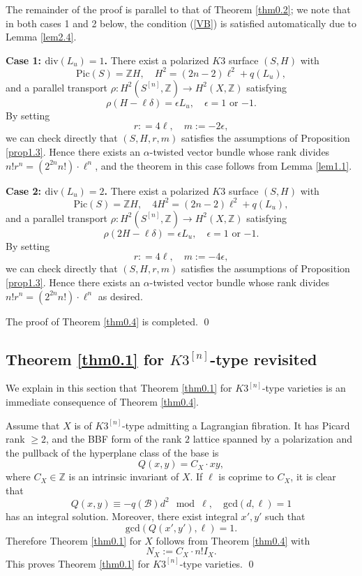 \documentclass[11pt]{amsart}
\theoremstyle{plain}
\theoremstyle{definition}
\theoremstyle{remark}
\newcommand{\BZ}{{\mathbb{Z}}}
\newcommand{\CB}{{\mathcal B}}
\begin{document}
The remainder of the proof is parallel to that of Theorem \ref{thm0.2}; we note that in both cases 1 and 2 below, the condition (\ref{VB}) is satisfied automatically due to Lemma \ref{lem2.4}.
\medskip



{\bf \noindent Case 1: $\mathrm{div}(L_u)=1$.} There exist a polarized $K3$ surface $(S,H)$ with
\[
\mathrm{Pic}(S) = \BZ H, \quad H^2= (2n-2)\ell^2+ q(L_u),
\]
and a parallel transport $\rho: H^2(S^{[n]}, \BZ) \to H^2(X,\BZ)$ satisfying 
\[
\rho\left(H-\ell \delta\right) = \epsilon L_u , \quad \epsilon  = 1 \textrm{ or } {-1}.
\]
By setting 
\[
r: = 4\ell, \quad  m := -2 \epsilon,
\]
we can check directly that $(S,H, r, m)$ satisfies the assumptions of Proposition \ref{prop1.3}. Hence there exists an $\alpha$-twisted vector bundle whose rank divides $n!r^n = \left(2^{2n}n!\right)\cdot \ell^n$, and the theorem in this case follows from Lemma \ref{lem1.1}.

\medskip

{\bf \noindent Case 2: $\mathrm{div}(L_u)=2$.} There exist a polarized $K3$ surface $(S,H)$ with
\[
\mathrm{Pic}(S) = \BZ H, \quad 4H^2= (2n-2)\ell^2+ q(L_u),
\]
and a parallel transport $\rho: H^2(S^{[n]}, \BZ) \to H^2(X,\BZ)$ satisfying 
\[
\rho\left(2H-\ell \delta\right) = \epsilon L_u , \quad \epsilon  = 1 \textrm{ or } {-1}.
\]
By setting 
\[
r: = 4\ell, \quad  m := -4 \epsilon,
\]
we can check directly that $(S,H, r, m)$ satisfies the assumptions of Proposition \ref{prop1.3}. Hence there exists an $\alpha$-twisted vector bundle whose rank divides $n!r^n = \left(2^{2n}n!\right)\cdot \ell^n$ as desired.

The proof of Theorem \ref{thm0.4} is completed. \qed



\subsection{Theorem \ref{thm0.1} for $K3^{[n]}$-type revisited}\label{revisit}

We explain in this section that Theorem \ref{thm0.1} for $K3^{[n]}$-type varieties is an immediate consequence of Theorem \ref{thm0.4}.

Assume that $X$ is of $K3^{[n]}$-type admitting a Lagrangian fibration. It has Picard rank $\geq 2$, and the BBF form of the rank $2$ lattice spanned by a polarization and the pullback of the hyperplane class of the base is
\[
Q(x,y) = C_X\cdot xy,
\]
where $C_X \in \BZ$ is an intrinsic invariant of $X$. If $\ell$ is coprime to $C_X$, it is clear that 
\[
Q(x,y) \equiv -q(\CB)d^2 \mod \ell, \quad \mathrm{gcd}(d,\ell)=1
\]
has an integral solution. Moreover, there exist integral $x',y'$ such that
\[
\mathrm{gcd}(Q(x',y'), \ell) =1.
\]
Therefore Theorem \ref{thm0.1} for $X$ follows from Theorem \ref{thm0.4} with 
\[
N_X:= C_X\cdot n!I_X.
\]
This proves Theorem \ref{thm0.1} for $K3^{[n]}$-type varieties.    \qed
\end{document}

